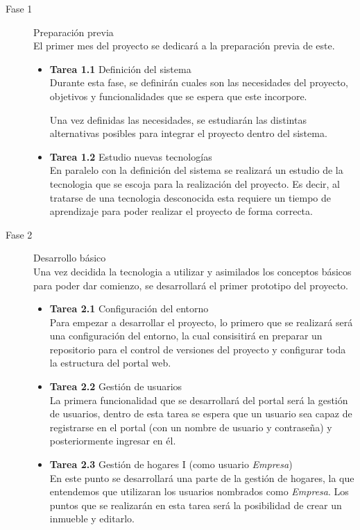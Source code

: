 \begin{description}
  \item[Fase 1] Preparación previa\\
  El primer mes del proyecto se dedicará a la preparación previa de este.
    \begin{itemize}
        \item \textbf{Tarea 1.1} Definición del sistema\\
        Durante esta fase, se definirán cuales son las necesidades del proyecto, objetivos y funcionalidades que se espera que este incorpore.
        
        Una vez definidas las necesidades, se estudiarán las distintas alternativas posibles para integrar el proyecto dentro del sistema.
        \item \textbf{Tarea 1.2} Estudio nuevas tecnologías\\
        En paralelo con la definición del sistema se realizará un estudio de la tecnologia que se escoja para la realización del proyecto. Es decir, al tratarse de una tecnologia desconocida esta requiere un tiempo de aprendizaje para poder realizar el proyecto de forma correcta.
    \end{itemize}
  \item[Fase 2] Desarrollo básico\\
  Una vez decidida la tecnologia a utilizar y asimilados los conceptos básicos para poder dar comienzo, se desarrollará el primer prototipo del proyecto.
    \begin{itemize}
        \item \textbf{Tarea 2.1} Configuración del entorno\\
        Para empezar a desarrollar el proyecto, lo primero que se realizará será una configuración del entorno, la cual consisitirá en preparar un repositorio para el control de versiones del proyecto y configurar toda la estructura del portal web.
        \item \textbf{Tarea 2.2} Gestión de usuarios\\
        La primera funcionalidad que se desarrollará del portal será la gestión de usuarios, dentro de esta tarea se espera que un usuario sea capaz de registrarse en el portal (con un nombre de usuario y contraseña) y posteriormente ingresar en él.
        \item \textbf{Tarea 2.3} Gestión de hogares I (como usuario \textit{Empresa})\\
        En este punto se desarrollará una parte de la gestión de hogares, la que entendemos que utilizaran los usuarios nombrados como \textit{Empresa}. Los puntos que se realizarán en esta tarea será la posibilidad de crear un inmueble y editarlo.

\end{itemize}
\end{description}
